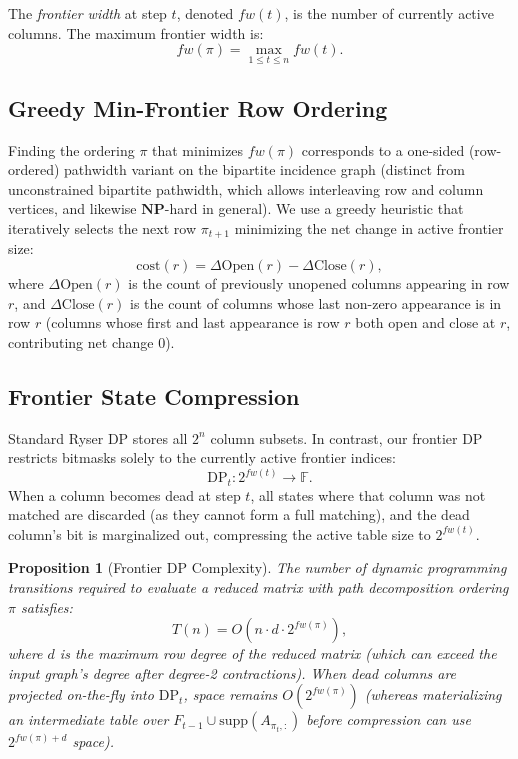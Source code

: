 \documentclass[11pt,a4paper]{article}
\newtheorem{proposition}[theorem]{Proposition}
\theoremstyle{definition}
\newcommand{\F}{\mathbb{F}}
\newcommand{\NP}{\mathbf{NP}}
\begin{document}
The \emph{frontier width} at step $t$, denoted $fw(t)$, is the number of currently active columns. The maximum frontier width is:
\begin{equation}
fw(\pi) = \max_{1 \le t \le n} fw(t).
\end{equation}

\subsection{Greedy Min-Frontier Row Ordering}

Finding the ordering $\pi$ that minimizes $fw(\pi)$ corresponds to a one-sided (row-ordered) pathwidth variant on the bipartite incidence graph (distinct from unconstrained bipartite pathwidth, which allows interleaving row and column vertices, and likewise $\NP$-hard in general). We use a greedy heuristic that iteratively selects the next row $\pi_{t+1}$ minimizing the net change in active frontier size:
\begin{equation}
\mathrm{cost}(r) = \Delta \mathrm{Open}(r) - \Delta \mathrm{Close}(r),
\end{equation}
where $\Delta \mathrm{Open}(r)$ is the count of previously unopened columns appearing in row $r$, and $\Delta \mathrm{Close}(r)$ is the count of columns whose last non-zero appearance is in row $r$ (columns whose first and last appearance is row $r$ both open and close at $r$, contributing net change $0$).

\subsection{Frontier State Compression}

Standard Ryser DP stores all $2^n$ column subsets. In contrast, our frontier DP restricts bitmasks solely to the currently active frontier indices:
\begin{equation}
\mathrm{DP}_t : 2^{fw(t)} \to \F.
\end{equation}
When a column becomes dead at step $t$, all states where that column was not matched are discarded (as they cannot form a full matching), and the dead column's bit is marginalized out, compressing the active table size to $2^{fw(t)}$.

\begin{proposition}[Frontier DP Complexity]
The number of dynamic programming transitions required to evaluate a reduced matrix with path decomposition ordering $\pi$ satisfies:
\begin{equation}
T(n) = O\left(n \cdot d \cdot 2^{fw(\pi)}\right),
\end{equation}
where $d$ is the maximum row degree of the reduced matrix (which can exceed the input graph's degree after degree-2 contractions). When dead columns are projected on-the-fly into $\mathrm{DP}_t$, space remains $O(2^{fw(\pi)})$ (whereas materializing an intermediate table over $F_{t-1} \cup \mathrm{supp}(A_{\pi_t, :})$ before compression can use $2^{fw(\pi)+d}$ space).
\end{proposition}
\end{document}
